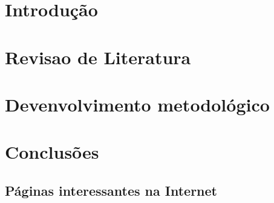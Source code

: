 \documentclass[doutorado, pre-defesa]{packages/icmc}
\begin{document}
\textual


\chapter{Introdução}
\label{chapter:introducao}


\chapter{Revisao de Literatura}
\label{chapter:revisao-literatura}


\chapter{Devenvolvimento metodológico}
\label{chapter:desenvolvimento-metodologico}


\chapter{Conclusões}
\label{chapter:conclusoes}


%

\postextual


\begin{anexosenv}

    \chapter{Páginas interessantes na Internet}
    \label{chapter:paginas-interessantes}
    

\end{anexosenv}
\end{document}
